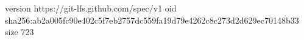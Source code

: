 version https://git-lfs.github.com/spec/v1
oid sha256:ab2a005fc90e402c5f7eb2757dc559fa19d79e4262c8c273d2d629ec70148b33
size 723
